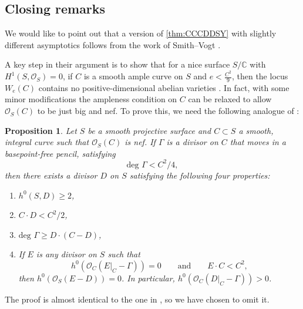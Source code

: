 \documentclass[fontsize=11pt,reqno]{amsart}
\newtheorem{proposition}[thm]{Proposition}
\theoremstyle{definition}
\theoremstyle{remark}
\renewcommand{\O}{\mathcal{O}}
\begin{document}
\subsection{Closing remarks}

We would like to point out that a version of \cref{thm:CCCDDSY} with slightly different asymptotics follows from the work of Smith--Vogt \cite{SmithVogt22}. 

A key step in their argument is to show that for a nice surface $S/\mathbb{C}$ with $H^1(S,\mathcal{O}_S)=0$, if $C$ is a smooth ample curve on $S$ and $e < \frac{C^2}{9}$, then the locus $W_e(C)$ contains no positive-dimensional abelian varieties \cite[Theorem 2.9]{SmithVogt22}. In fact, with some minor modifications the ampleness condition on $C$ can be relaxed to allow $\O_{S}(C)$ to be just big and nef. To prove this, we need the following analogue of \cite[Proposition 2.5]{SmithVogt22}:

\begin{proposition}\label{prop:ExistsDivisor}
Let $S$ be a smooth projective surface and $C\subset S$ a smooth, integral curve such that $\mathcal{O}_S(C)$ is nef. If $\Gamma$ is a divisor on $C$ that moves in a basepoint-free pencil, satisfying \begin{equation*}
    \text{deg } \Gamma < C^2/4,
\end{equation*} 
then there exists a divisor $D$ on $S$ satisfying the following four properties:
\begin{enumerate}[itemsep=0pt]
    \item $h^0(S,D)\geq 2$,
    \item $C\cdot D < C^2/2$,
    \item $\text{deg } \Gamma \geq D \cdot (C-D)$,
    \item If $E$ is any divisor on $S$ such that
\begin{equation*}\label{eConditions}
h^0(\O_C(E|_C - \Gamma)) = 0 \qquad \text{and} \qquad E \cdot C < C^2, \end{equation*}
then $h^0(\O_S(E - D)) = 0$.  In particular, $h^0(\O_C(D|_C - \Gamma)) > 0$.
\end{enumerate}
\end{proposition}

\noindent The proof is almost identical to the one in \cite[Proposition 2.5]{SmithVogt22}, so we have chosen to omit it.
\end{document}
